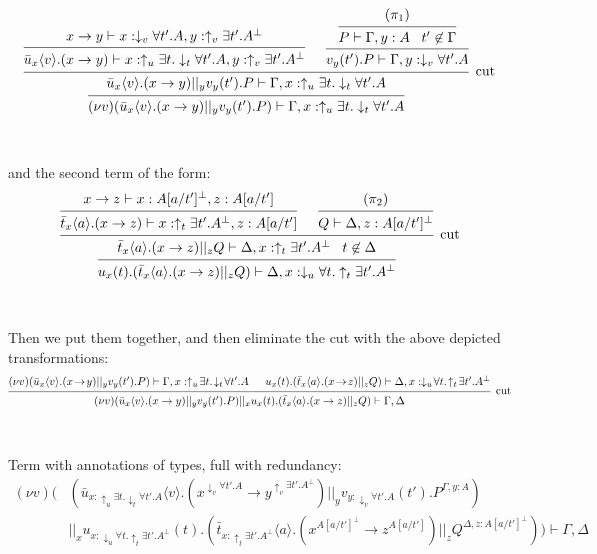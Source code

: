 \documentclass[a4paper,12pt]{article}
\begin{document}
\[\begin{prooftree}
				\hypo{x\to y \vdash x:\downarrow_v\forall t'.A, y:\uparrow_v\exists t'.A^\bot}
			\infer1{\bar{u}_x\langle v\rangle.(x\to y) \vdash x:\uparrow_u\exists t.\downarrow_t\forall t'.A, y:\uparrow_v\exists t'.A^\bot}
					\hypo{(\pi_1)}
				\infer1{P \vdash \Gamma, y:A\;\;\; t' \not\in \Gamma}
			\infer1{v_y(t').P \vdash \Gamma, y:\downarrow_v\forall t'.A}
		\infer2[cut]{\bar{u}_x\langle v\rangle.(x\to y) ||_y v_y(t').P \vdash \Gamma, x:\uparrow_u\exists t.\downarrow_t\forall t'.A}
	\infer1{(\nu v)(\bar{u}_x\langle v\rangle.(x\to y) ||_y v_y(t').P) \vdash \Gamma, x:\uparrow_u\exists t.\downarrow_t\forall t'.A}
\end{prooftree}\]
~\\~\\
and the second term of the form:
\[\begin{prooftree}
				\hypo{x\to z \vdash x:A[a/t']^\bot, z:A[a/t']}
			\infer1{\bar{t}_x\langle a\rangle.(x\to z) \vdash x:\uparrow_t\exists t'.A^\bot, z:A[a/t']}
				\hypo{(\pi_2)}
			\infer1{Q \vdash \Delta, z:A[a/t']^\bot}
		\infer2[cut]{\bar{t}_x\langle a\rangle.(x\to z) ||_z Q \vdash \Delta, x:\uparrow_t\exists t'.A^\bot\;\;\; t\not\in \Delta}
	\infer1{u_x(t).(\bar{t}_x\langle a\rangle.(x\to z) ||_z Q) \vdash \Delta, x:\downarrow_u\forall t.\uparrow_t\exists t'.A^\bot}
\end{prooftree}\]
~\\~\\
Then we put them together, and then eliminate the cut with the above depicted transformations:
\[\begin{prooftree}
		\hypo{(\nu v)(\bar{u}_x\langle v\rangle.(x\!\to\! y) ||_y v_y(t').P) \vdash \Gamma, x:\uparrow_u\!\exists t.\!\downarrow_t\!\forall t'.A}
		\hypo{u_x(t).(\bar{t}_x\langle a\rangle.(x\!\to\! z) ||_z Q) \vdash \Delta, x:\downarrow_u\!\forall t.\!\uparrow_t\!\exists t'.A^\bot}
	\infer2[cut]{(\nu v)(\bar{u}_x\langle v\rangle.(x\to y) ||_y v_y(t').P) ||_x u_x(t).(\bar{t}_x\langle a\rangle.(x\to z) ||_z Q) \vdash \Gamma, \Delta}
\end{prooftree}\]
~\\~\\
Term with annotations of types, full with redundancy:
\begin{align*}
(\nu v)( & \left(\bar{u}_{x:\uparrow_u\exists t.\downarrow_t\forall t'.A}\langle v\rangle.(x^{\downarrow_v\forall t'.A}\to y^{\uparrow_v\exists t'.A^\bot}) ||_y v_{y:\downarrow_v\forall t'.A}(t').P^{\Gamma, y:A}\right)\\
& ||_x u_{x:\downarrow_u\forall t.\uparrow_t\exists t'.A^\bot}(t).\left(\bar{t}_{x:\uparrow_t\exists t'.A^\bot}\langle a\rangle.(x^{A[a/t']^\bot}\to z^{A[a/t']}) ||_z Q^{\Delta,z:A[a/t']^\bot}\right)) \vdash \Gamma,\Delta
\end{align*}
\end{document}
